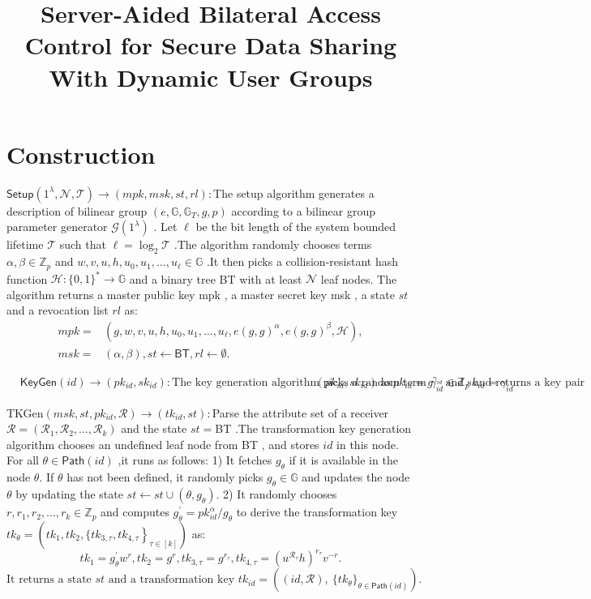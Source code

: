 \documentclass[runningheads]{llncs}
\begin{document}
\title{Server-Aided Bilateral Access Control for Secure Data Sharing With Dynamic User Groups}

\section{Construction}
$\mathsf{Setup}(1^\lambda,\mathcal{N},\mathcal{T})\to(mpk,msk,st,rl):$The setup algorithm generates a description of bilinear group $(e,\mathbb{G},\mathbb{G}_T,g,p)$ according to a bilinear group parameter generator $\mathcal{G}(1^\lambda)$ . Let $\ell$ be the bit length of the system bounded lifetime $\mathcal{T}$ such that $\ell=\log_2\mathcal{T}$ .The algorithm randomly chooses terms $\alpha,\beta\in\mathbb{Z}_p$ and $w,v,u,h,u_0,u_1,\ldots,u_\ell\in\mathbb{G}$ .It then picks a collision-resistant hash function $\mathcal{H}:\{0,1\}^*\to\mathbb{G}$ and a binary tree BT with at least $\mathcal{N}$ leaf nodes. The algorithm returns a master public key mpk , a master secret key msk , a state $st$ and a revocation list $rl$ as:
\begin{align*} mpk=&(g,w,v,u,h,u_{0},u_{1},\ldots,u_\ell,e(g,g)^\alpha,e(g,g)^\beta,\mathcal {H}),\\ msk=&(\alpha,\beta),st\leftarrow {\textsf {BT}},rl\leftarrow \emptyset.\end{align*}

$\begin{aligned}&\mathsf{KeyGen}(id)\to(pk_{id},sk_{id}):\text{The key generation algorithm picks a random term }\gamma_{id}\in\mathbb{Z}_p\text{ and returns a key pair}&(pk_{id},sk_{id})\mathrm{~as~}pk_{id}=g^{\gamma_{id}}\mathrm{~and~}sk_{id}=\gamma_{id}\mathrm{~.}\end{aligned}$

TKGen$(msk,st,pk_{id},\mathcal{R})\to(tk_{id},st):$Parse the attribute set of a receiver $\mathcal{R}=(\mathcal{R}_1,\mathcal{R}_2,\ldots,\mathcal{R}_k)$ and the state $st=$BT .The transformation key generation algorithm chooses an undefined leaf node from BT , and stores $id$ in this node. For all $\theta\in\mathsf{Path}(id)$ ,it runs as follows:
1) It fetches $g_\theta$ if it is available in the node $\theta.$ If $\theta$ has not been defined, it randomly picks $g_\theta\in\mathbb{G}$ and updates the
node $\theta$ by updating the state $st\leftarrow st\cup\left(\theta,g_\theta\right).$
2) It randomly chooses $r,r_1,r_2,\ldots,r_k\in\mathbb{Z}_p$ and computes $g_\theta^\prime=pk_{id}^\alpha/g_\theta$ to derive the transformation key
$tk_\theta=(tk_1,tk_2,\left.\{tk_{3,\tau},tk_{4,\tau}\right\}_{\tau\in[k]})$ as:
\begin{equation*} tk_{1}\!=\!g_\theta ^{\prime }w^{r},tk_{2}=g^{r},tk_{3,\tau }=g^{r_\tau },tk_{4,\tau }=(u^{\mathcal {R}_\tau }h)^{r_\tau }v^{-r}.\end{equation*}
$\text{It returns a state }st\text{ and a transformation key }tk_{id}=\left((id,\mathcal{R}),\mathrm{~}\{tk_\theta\}_{\theta\in\mathsf{Path}(id)}\right).$
\end{document}
